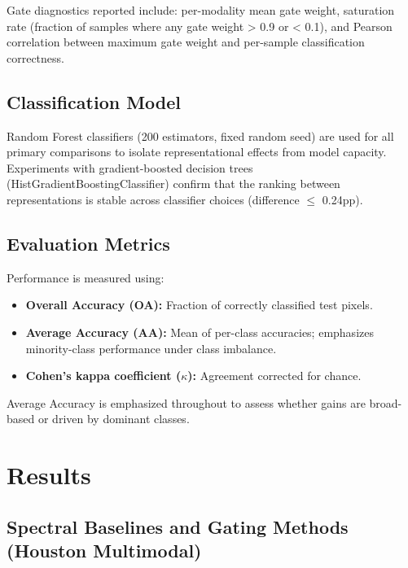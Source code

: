 \documentclass[
  journal]{IEEEtran}
\providecommand{\tightlist}{%
  \setlength{\itemsep}{0pt}\setlength{\parskip}{0pt}}
\begin{document}
Gate diagnostics reported include: per-modality mean gate weight,
saturation rate (fraction of samples where any gate weight
\textgreater{} 0.9 or \textless{} 0.1), and Pearson correlation between
maximum gate weight and per-sample classification correctness.

\subsection{Classification Model}\label{classification-model}

Random Forest classifiers (200 estimators, fixed random seed) are used
for all primary comparisons to isolate representational effects from
model capacity. Experiments with gradient-boosted decision trees
(HistGradientBoostingClassifier) confirm that the ranking between
representations is stable across classifier choices (difference \(\leq\)
0.24pp).

\subsection{Evaluation Metrics}\label{evaluation-metrics}

Performance is measured using:

\begin{itemize}
\tightlist
\item
  \textbf{Overall Accuracy (OA):} Fraction of correctly classified test
  pixels.
\item
  \textbf{Average Accuracy (AA):} Mean of per-class accuracies;
  emphasizes minority-class performance under class imbalance.
\item
  \textbf{Cohen's kappa coefficient (\(\kappa\)):} Agreement corrected for
  chance.
\end{itemize}

Average Accuracy is emphasized throughout to assess whether gains are
broad-based or driven by dominant classes.

\section{Results}\label{results}

\subsection{Spectral Baselines and Gating Methods (Houston
Multimodal)}\label{spectral-baselines-and-gating-methods-houston-multimodal}
\end{document}
